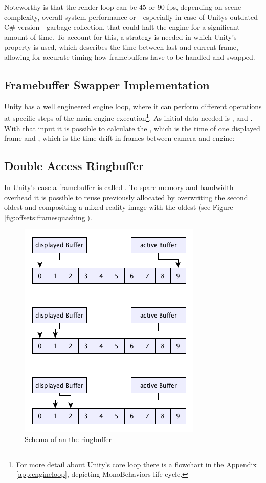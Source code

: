 Noteworthy is that the render loop can be 45 or 90 fps, depending on scene 
complexity, overall system performance or - especially in case of Unitys 
outdated C\# version - garbage collection, that could halt the engine for a 
significant amount of time. To account for this, a strategy is needed in which 
Unity's  property is used, which describes the time 
between last and current frame, allowing for accurate timing how framebuffers 
have to be handled and swapped.

\subsection{Framebuffer Swapper Implementation}

Unity has a well engineered engine loop, where it can perform different 
operations at specific steps of the main engine execution\footnote{For more 
detail about Unity's core loop there is a flowchart in the Appendix 
\ref{app:engineloop}, depicting MonoBehaviors life cycle.}. As 
initial data needed is ,  and 
. With that input it is possible to calculate the 
, which is the time of one displayed frame and 
, which is the time drift in frames between camera and engine:



\subsection{Double Access Ringbuffer}

In Unity's case a framebuffer is called . To spare 
memory and bandwidth overhead it is possible to reuse previously allocated 
 by overwriting the second oldest  and 
compositing a mixed reality image with the oldest (see  
Figure \ref{fig:offsets:framesquashing}).

\begin{figure}[htb]
	\centering
	\includegraphics[width=.5\textwidth]{gfx/ringbuffer_schematics.png}
	\caption{Schema of an the ringbuffer}
	\label{fig:offsets:ringbuffer}
\end{figure}

